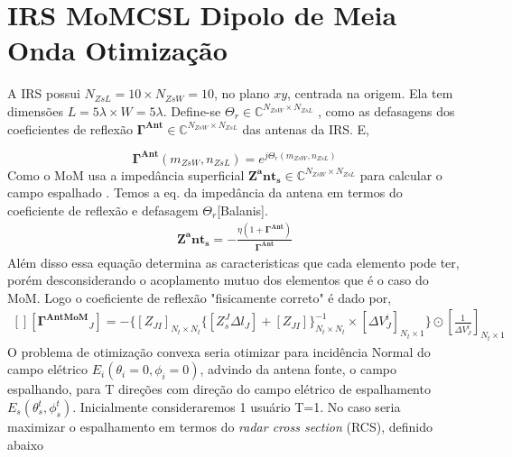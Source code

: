 \documentclass[
	12pt,				%
	openright,			%
	oneside,			%
	a4papey79r,			%
	english,			%
	brazil				%
	]{abntex2}
\begin{document}
\chapter{IRS MoMCSL Dipolo de Meia Onda Otimização}

 A IRS possui $N_{ZsL}=10 \times N_{ZsW}=10 $, no plano $xy$, centrada na origem. Ela tem dimensões $L=5\lambda \times W=5 \lambda$.
Define-se $\Theta_r \in \mathbb{C}^{N_{ZsW} \times N_{ZsL}}  $ , como as defasagens dos coeficientes de reflexão $\mathbf{\Gamma^{Ant}} \in \mathbb{C}^{N_{ZsW} \times N_{ZsL}}  $ das antenas da IRS. E,

\begin{equation}
    \mathbf{\Gamma^{Ant}}({m_{ZsW},n_{ZsL}})=e^{j\Theta_r({m_{ZsW},n_{ZsL}})}
\end{equation}
Como o MoM usa a impedância superficial $\mathbf{Z^ant_s} \in \mathbb{C}^{N_{ZsW} \times N_{ZsL}}  $ para calcular o campo espalhado . Temos a eq. da impedância da antena em termos do coeficiente de reflexão e defasagem $\Theta_r$[Balanis].
\begin{equation}
\begin{aligned}
  \mathbf{Z^ant_s} =-\frac{\eta(1+\mathbf{\Gamma^{Ant}})}{\mathbf{\Gamma^{Ant}}} 
   \end{aligned}
\end{equation}
Além disso essa equação determina as caracteristicas que cada elemento pode ter, porém desconsiderando o acoplamento mutuo dos elementos que é o caso do MoM. Logo o  coeficiente de reflexão "fisicamente correto" é dado por,
\begin{equation}
\begin{aligned}
[][ \mathbf{\Gamma^{AntMoM}}_J  
 ]=-
  \biggl\{[Z_{JI}]_{N_t \times N_t} \{ [Z_{s}^J\Delta l_J]+[Z_{JI}]\}^{-1}_{N_t \times N_t} \times[\Delta V^i_J]_{N_t \times 1} \biggl\} \odot{[\frac{1}{\Delta V_J^i}]_{N_t \times 1}}
   \end{aligned}
\end{equation}
O problema de otimização convexa seria otimizar para incidência Normal do campo elétrico $E_i(\theta_i=0,\phi_i=0)$,  advindo da antena fonte,  o campo espalhando, para T direções com direção do campo elétrico de espalhamento $E_s(\theta_s^t,\phi_s^t)$. Inicialmente consideraremos 1 usuário T=1. No caso seria maximizar o espalhamento em termos do  \emph{radar cross section } (RCS), definido abaixo
\end{document}
